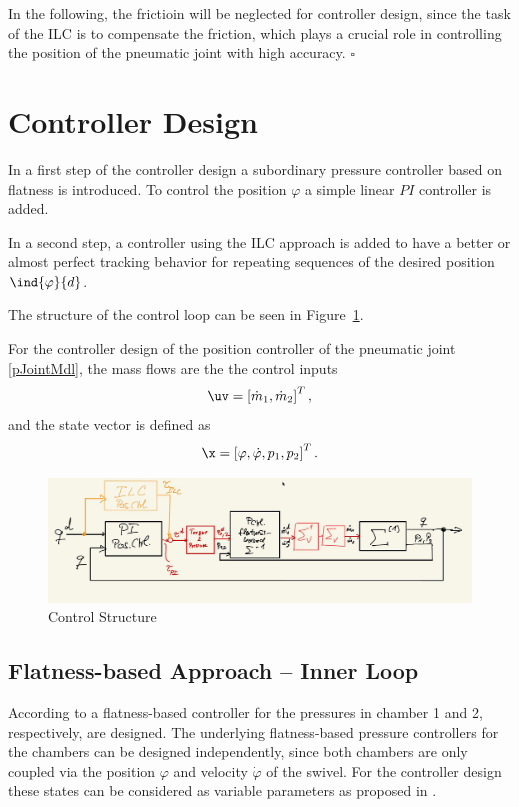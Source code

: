 \documentclass[conference]{IEEEtran}
\newcommand{\vp}{\varphi}
\newcommand{\vpd}{\ind{\vp}{d}}
\begin{document}
\begin{Remark}\label{rem:friction}
  In the following, the frictioin will be neglected for controller
  design, since the task of the ILC is to compensate the friction,
  which plays a crucial role in controlling the position of the
  pneumatic joint with high accuracy. \hfill $\square$
\end{Remark}


\section{Controller Design}

In a first step of the controller design a subordinary pressure
controller based on flatness is introduced. To control the position
$\varphi$ a simple linear $PI$ controller is added.

In a second step, a controller using the ILC approach is added to have
a better or almost perfect tracking behavior for repeating sequences
of the desired position $\vpd$.

The structure of the control loop can be seen in Figure~\ref{fig:CtrlStrct}.

For the controller design of the position controller of the pneumatic
joint \eqref{pJointMdl}, the mass flows are the the control inputs
\begin{equation}\label{Uctrl}
  \uv = \left[\dot m_1, \dot m_2 \right]^T,
\end{equation}
and the state vector is defined as
\begin{equation}\label{states}
  \x = \left[\vp, \dot\vp, p_1, p_2\right]^T.
\end{equation}

\begin{figure}[tbp]
\centerline{\includegraphics[scale=0.5]{./pictures/CtrlStructure_ILC.jpg}}
\caption{Control Structure}
\label{fig:CtrlStrct}
\end{figure}

\subsection{Flatness-based Approach -- Inner Loop}\label{FlatDesign}
According to \cite{Rothfus1997} a flatness-based controller for the
pressures in chamber 1 and 2, respectively, are designed. The
underlying flatness-based pressure controllers for the chambers can be
designed independently, since both chambers are only coupled via the
position $\vp$ and velocity $\dot \vp$ of the swivel. For the
controller design these states can be considered as variable
parameters as proposed in \cite{Falkenhahn2017}.
\end{document}
